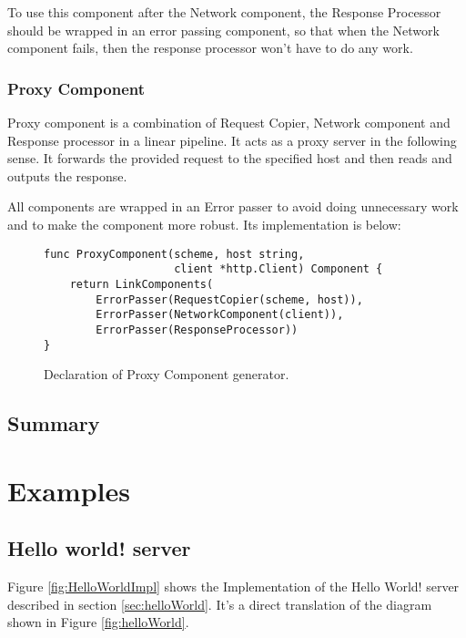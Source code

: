 \documentclass[12pt,a4paper]{article}
\begin{document}
To use this component after the Network component, the Response Processor
should be wrapped in an error passing component, so that when the 
Network component fails, then the response processor won't have to do
any work.

\subsubsection{Proxy Component}
Proxy component is a combination of Request Copier, Network component 
and Response processor in a linear pipeline. It acts as a proxy server
in the following sense. It forwards the provided request to the specified
host and then reads and outputs the response. 

All components are wrapped
in an Error passer to avoid doing unnecessary work and to make the component
more robust. Its implementation is below:

\begin{figure}[h]
\centering
\begin{lstlisting}
func ProxyComponent(scheme, host string, 
					client *http.Client) Component {
	return LinkComponents(
		ErrorPasser(RequestCopier(scheme, host)),
		ErrorPasser(NetworkComponent(client)),
		ErrorPasser(ResponseProcessor))
}
\end{lstlisting}
\caption[scale=1.0]{Declaration of Proxy Component generator.}
\label{fig:ProxyComp}
\end{figure}

\subsection{Summary}


\newpage
\section{Examples}
\label{sec:examples}
\subsection{Hello world! server}
Figure \ref{fig:HelloWorldImpl} shows the Implementation of the Hello World!
server described in section \ref{sec:helloWorld}.
It's a direct translation of the diagram shown in Figure \ref{fig:helloWorld}.
\end{document}

